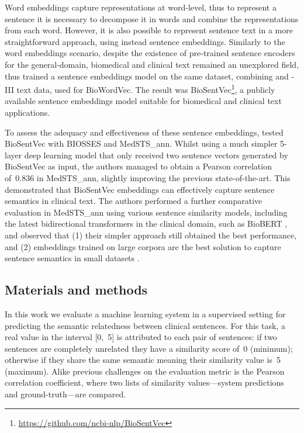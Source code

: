 Word embeddings capture representations at word-level, thus to represent a sentence it is necessary to decompose it in words and combine the representations from each word.
However, it is also possible to represent sentence text in a more straightforward approach, using instead sentence embeddings.
Similarly to the word embeddings scenario, despite the existence of pre-trained sentence encoders for the general-domain, biomedical and clinical text remained an unexplored field, thus \textcite{chen2019g} trained a sentence embeddings model on the same dataset, combining  and -III text data, used for BioWordVec.
The result was BioSentVec\footnote{\url{https://github.com/ncbi-nlp/BioSentVec}}, a publicly available sentence embeddings model suitable for biomedical and clinical text applications.

To assess the adequacy and effectiveness of these sentence embeddings, \textcite{chen2019g} tested BioSentVec with BIOSSES and MedSTS\_ann.
Whilst using a much simpler 5-layer deep learning model that only received two sentence vectors generated by BioSentVec as input, the authors managed to obtain a Pearson correlation of~0.836 in MedSTS\_ann, slightly improving the previous state-of-the-art.
This demonstrated that BioSentVec embeddings can effectively capture sentence semantics in clinical text.
The authors performed a further comparative evaluation in MedSTS\_ann using various sentence similarity models, including the latest bidirectional transformers in the clinical domain, such as BioBERT \parencite{lee2020a}, and observed that (1) their simpler approach still obtained the best performance, and (2) embeddings trained on large corpora are the best solution to capture sentence semantics in small datasets \parencite{chen2019a}.


\subsection{Materials and methods}

In this work we evaluate a machine learning system in a supervised setting for predicting the semantic relatedness between clinical sentences.
For this task, a real value in the interval [0,~5] is attributed to each pair of sentences: if two sentences are completely unrelated they have a similarity score of~0 (minimum); otherwise if they share the same semantic meaning their similarity value is~5 (maximum).
Alike previous challenges on  \parencite{wang2018e,cer2017a} the evaluation metric is the Pearson correlation coefficient, where two lists of similarity values---system predictions and ground-truth---are compared.

